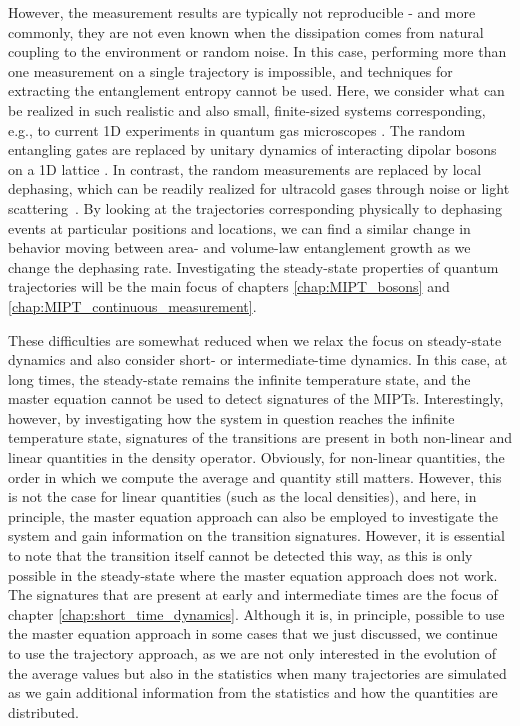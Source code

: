 However, the measurement results are typically not reproducible - and more commonly, they are not even known when the dissipation comes from natural coupling to the environment or random noise. In this case, performing more than one measurement on a single trajectory is impossible, and techniques for extracting the entanglement entropy cannot be used. Here, we consider what can be realized in such realistic and also small, finite-sized systems corresponding, e.g., to current 1D experiments in quantum gas microscopes \cite{bakr2009, sherson2010, gross2021}. The random entangling gates are replaced by unitary dynamics of interacting dipolar bosons on a 1D lattice \cite{patscheider2020}. In contrast, the random measurements are replaced by local dephasing, which can be readily realized for ultracold gases through noise or light scattering~\cite{luschen2017,pichler2010,sarkar2014,poletti2013}. By looking at the trajectories corresponding physically to dephasing events at particular positions and locations, we can find a similar change in behavior moving between area- and volume-law entanglement growth as we change the dephasing rate. Investigating the steady-state properties of quantum trajectories will be the main focus of chapters \ref{chap:MIPT_bosons} and \ref{chap:MIPT_continuous_measurement}.

These difficulties are somewhat reduced when we relax the focus on steady-state dynamics and also consider short- or intermediate-time dynamics. In this case, at long times, the steady-state remains the infinite temperature state, and the master equation cannot be used to detect signatures of the MIPTs. Interestingly, however, by investigating how the system in question reaches the infinite temperature state, signatures of the transitions are present in both non-linear and linear quantities in the density operator. Obviously, for non-linear quantities, the order in which we compute the average and quantity still matters. However, this is not the case for linear quantities (such as the local densities), and here, in principle, the master equation approach can also be employed to investigate the system and gain information on the transition signatures. However, it is essential to note that the transition itself cannot be detected this way, as this is only possible in the steady-state where the master equation approach does not work. The signatures that are present at early and intermediate times are the focus of chapter \ref{chap:short_time_dynamics}. Although it is, in principle, possible to use the master equation approach in some cases that we just discussed, we continue to use the trajectory approach, as we are not only interested in the evolution of the average values but also in the statistics when many trajectories are simulated as we gain additional information from the statistics and how the quantities are distributed.

